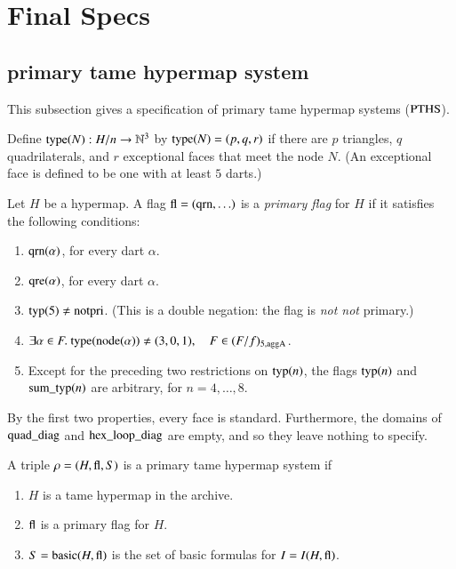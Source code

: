 \section{Final Specs}


\subsection{primary tame hypermap system}
\label{sec:PTHS}

This subsection gives a specification of primary tame hypermap
systems (${\operatorname{PTHS}}$).

Define ${\operatorname{type}}(N):H/n\to\mathbb{N}^3$ by ${\operatorname{type}}(N) = (p,q,r)$
if there are $p$ triangles, $q$ quadrilaterals, and $r$
exceptional faces that meet the node $N$.  (An exceptional face is
defined to be one with at least $5$ darts.)


\begin{definition}
Let $H$ be a hypermap.  A flag ${\operatorname{fl}} = ({\operatorname{qrn}},\ldots)$ is a
{\it primary flag} for $H$ if it satisfies the following
conditions:
    \begin{enumerate}
        \item ${\operatorname{qrn}}(\alpha)$, for every dart $\alpha$.
        \item ${\operatorname{qre}}(\alpha)$, for every dart $\alpha$.
        \item ${\operatorname{typ}}(5)\ne{\operatorname{notpri}}$.  (This is a double negation: the flag is
        {\it not not\/} primary.)
        \item $\exists\alpha\in F.\ \op{type}(\op{node}(\alpha)) \ne
    (3,0,1),\quad F\in (F/f)_{5,\op{aggA}}$.
        \item Except for the preceding two restrictions on ${\operatorname{typ}}(n)$, the flags
        ${\operatorname{typ}}(n)$ and ${\operatorname{sum\_typ}}(n)$ are arbitrary, for $n=4,\ldots,8$.
    \end{enumerate}
\end{definition}

\begin{remark} By the first two properties, every face is
standard.  Furthermore, the domains of ${\operatorname{quad\_diag}}$ and
${\operatorname{hex\_loop\_diag}}$ are empty, and so they leave nothing to
specify.
\end{remark}

\begin{definition}
A triple $\rho=(H,{\operatorname{fl}},S)$ is a primary tame hypermap system if
    \begin{enumerate}
    \item $H$ is a tame hypermap in the archive.
    \item ${\operatorname{fl}}$ is a primary flag for $H$.
    \item $S={\operatorname{basic}}(H,{\operatorname{fl}})$ is the set of basic formulas for $I=I(H,{\operatorname{fl}})$.
    \end{enumerate}
\end{definition}



